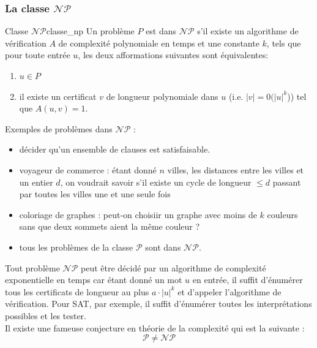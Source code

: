 \subsubsection{La classe $\mathcal{NP}$}
\label{sub:la_classe_np}
\begin{definition}{Classe $\mathcal{NP}$}{classe_np}
    Un problème $P$ est dans $\mathcal{NP}$ s'il existe un algorithme de vérification $A$ de complexité polynomiale en temps
    et une constante $k$, tels que pour toute entrée $u$, les deux afformations suivantes sont équivalentes:
    \begin{enumerate}
        \item $u\in P$
        \item il existe un certificat $v$ de longueur polynomiale dans $u$ (i.e. $|v| = 0(|u|^k$)) tel que $A(u,v)=1$.
    \end{enumerate}
\end{definition}
\begin{example}
    Exemples de problèmes dans $\mathcal{NP}$ :
    \begin{itemize}[label=\textbullet]
        \item décider qu'un ensemble de clauses est satisfaisable.
        \item voyageur de commerce : étant donné $n$ villes, les distances entre les villes et un entier $d$, on voudrait
        savoir s'il existe un cycle de longueur $\leq d$ passant par toutes les villes une et une seule fois
        \item coloriage de graphes : peut-on choisiir un graphe avec moins de $k$ couleurs sans que deux sommets aient la 
        même couleur ?
        \item tous les problèmes de la classe $\mathcal{P}$ sont dans $\mathcal{NP}$.
    \end{itemize}
\end{example}
Tout problème $\mathcal{NP}$ peut être décidé par un algorithme de complexité exponentielle en temps car étant donné un mot
$u$ en entrée, il suffit d'énumérer tous les certificats de longueur au plus $a\cdot|u|^k$ et d'appeler l'algorithme de 
vérification. Pour SAT, par exemple, il suffit d'énumérer toutes les interprétations possibles et les tester.\\
Il existe une fameuse conjecture en théorie de la complexité qui est la suivante : 
\begin{equation*}
    \mathcal{P}\neq\mathcal{NP}
\end{equation*}

